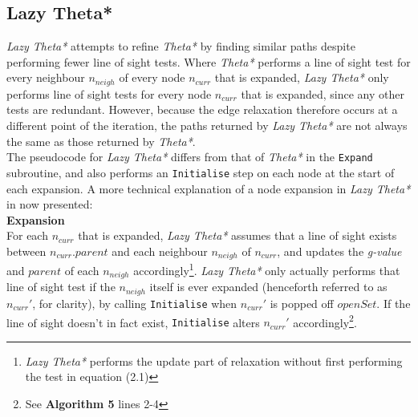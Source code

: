 \documentclass[12pt,notitlepage]{report}
\begin{document}
\subsection {Lazy Theta*}

{\em Lazy Theta*} attempts to refine {\em Theta*} by finding similar paths despite performing fewer line of sight tests. Where {\em Theta*} performs a line of sight test for every neighbour $n_{neigh}$ of every node $n_{curr}$ that is expanded, {\em Lazy Theta*} only performs line of sight tests for every node $n_{curr}$ that is expanded, since any other tests are redundant. However, because the edge relaxation therefore occurs at a different point of the iteration, the paths returned by {\em Lazy Theta*} are not always the same as those returned by {\em Theta*}.\\

\noindent
The pseudocode for {\em Lazy Theta*} differs from that of {\em Theta*} in the {\tt Expand} subroutine, and also performs an {\tt Initialise} step on each node at the start of each expansion. A more technical explanation of a node expansion in {\em Lazy Theta*} in now presented:\\

\noindent
{\bf Expansion}\\
\noindent
For each $n_{curr}$ that is expanded, {\em Lazy Theta*} assumes that a line of sight exists between $n_{curr}.parent$ and each neighbour $n_{neigh}$ of $n_{curr}$, and updates the {\em g-value} and $parent$ of each $n_{neigh}$ accordingly\footnote{{\em Lazy Theta*} performs the update part of relaxation without first performing the test in equation (2.1)}. {\em Lazy Theta*} only actually performs that line of sight test if the $n_{neigh}$ itself is ever expanded (henceforth referred to as $n_{curr}'$, for clarity), by calling {\tt Initialise} when $n_{curr}'$ is popped off $openSet$. If the line of sight doesn't in fact exist, {\tt Initialise} alters $n_{curr}'$ accordingly\footnote{See {\bfseries Algorithm 5} lines 2-4}.
\end{document}
